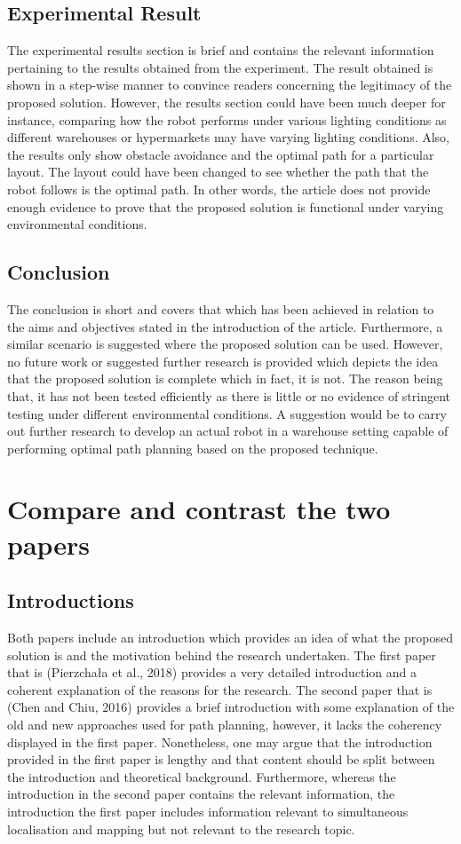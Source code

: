 \documentclass[a4paper, 12pt]{article}
\begin{document}
\subsection{Experimental Result}
The experimental results section is brief and contains the relevant information pertaining to the results obtained from the experiment. The result obtained is shown in a step-wise manner to convince readers concerning the legitimacy of the proposed solution. However, the results section could have been much deeper for instance, comparing how the robot performs under various lighting conditions as different warehouses or hypermarkets may have varying lighting conditions. Also, the results only show obstacle avoidance and the optimal path for a particular layout. The layout could have been changed to see whether the path that the robot follows is the optimal path. In other words, the article does not provide enough evidence to prove that the proposed solution is functional under varying environmental conditions.  

\subsection{Conclusion}
The conclusion is short and covers that which has been achieved in relation to the aims and objectives stated in the introduction of the article. Furthermore, a similar scenario is suggested where the proposed solution can be used. However, no future work or suggested further research is provided which depicts the idea that the proposed solution is complete which in fact, it is not. The reason being that, it has not been tested efficiently as there is little or no evidence of stringent testing under different environmental conditions. A suggestion would be to carry out further research to develop an actual robot in a warehouse setting capable of performing optimal path planning based on the proposed technique.

\section{Compare and contrast the two papers}

\subsection{Introductions}
Both papers include an introduction which provides an idea of what the proposed solution is and the motivation behind the research undertaken. The first paper that is (Pierzchała et al., 2018)  provides a very detailed introduction and a coherent explanation of the reasons for the research. The second paper that is (Chen and Chiu, 2016) provides a brief introduction with some explanation of the old and new approaches used for path planning, however, it lacks the coherency displayed in the first paper. Nonetheless, one may argue that the introduction provided in the first paper is lengthy and that content should be split between the introduction and theoretical background. Furthermore, whereas the introduction in the second paper contains the relevant information, the introduction the first paper includes information relevant to simultaneous localisation and mapping but not relevant to the research topic.
\end{document}
